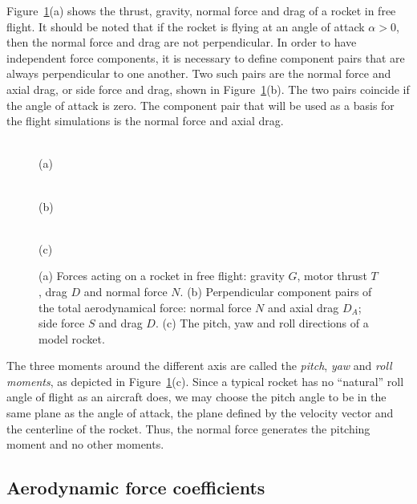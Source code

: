 Figure~\ref{fig-aerodynamic-forces}(a) shows the thrust, gravity,
normal force and drag of a rocket in free flight.  It should be noted
that if the rocket is flying at an angle of attack $\alpha>0$, then
the normal force and drag are not perpendicular.  In order to have
independent force components, it is necessary to define component
pairs that are always perpendicular to one another.  Two such pairs
are the normal force and axial drag, or side force and drag, shown in
Figure~\ref{fig-aerodynamic-forces}(b).  The two pairs coincide if the
angle of attack is zero.  The component pair that will be used as a
basis for the flight simulations is the normal force and axial drag.


\begin{figure}
\centering
\parbox{35mm}{\centering
{} \\ (a)}
\hfill
\parbox{35mm}{\centering
{} \\ (b)}
\hfill
\parbox{35mm}{\centering
{} \\ (c)}
\caption{(a) Forces acting on a rocket in free flight: gravity $G$,
  motor thrust $T$, drag $D$ and normal force $N$.  (b) Perpendicular
  component pairs of the total aerodynamical force: normal force $N$
  and axial drag $D_A$; side force $S$ and drag $D$.  (c) The pitch,
  yaw and roll directions of a model rocket.}
\label{fig-aerodynamic-forces}
\end{figure}


The three moments around the different axis are called the 
{\it pitch}, {\it yaw} and {\it roll moments}, as depicted in
Figure~\ref{fig-aerodynamic-forces}(c).  Since a typical rocket has no
``natural'' roll angle of flight as an aircraft does, we may choose
the pitch angle to be in the same plane as the angle of attack, \ie
the plane defined by the velocity vector and the centerline of the
rocket.  Thus, the normal force generates the pitching moment and no
other moments.





\subsection{Aerodynamic force coefficients}

